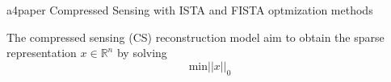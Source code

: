 {a4paper}
Compressed Sensing with ISTA and FISTA optmization methods

The compressed sensing (CS) reconstruction model aim to obtain the sparse representation $x \in \mathbb{R}^n $ by solving $$ \mathrm{min} ||x||_0 $$

